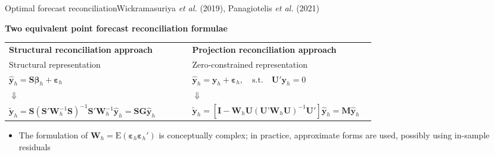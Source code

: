 \documentclass[aspectratio=169, table,colorlinks]{beamer}
\newcommand{\yvet}{\bm{y}}
\newcommand{\Gvet}{\bm{G}}
\newcommand{\Ivet}{\bm{I}}
\newcommand{\Mvet}{\bm{M}}
\newcommand{\Svet}{\bm{S}}
\newcommand{\Uvet}{\bm{U}}
\newcommand{\Wvet}{\bm{W}}
\newcommand{\betavet}{\bm{\beta}}
\newcommand{\epsvet}{\bm{\varepsilon}}
\begin{document}
\begin{frame}{Optimal forecast reconciliation}{Wickramasuriya \textit{et al.} (2019), Panagiotelis \textit{et al.} (2021)}
	\begin{block}{}\centering
\vskip0.15cm
	\textbf{Two equivalent point forecast reconciliation formulae}
\vskip0.25cm
\begin{tabular}{M{0.48\linewidth}|M{0.48\linewidth}}
	\textbf{\color{newblue}Structural reconciliation approach} & \textbf{\color{newblue}Projection reconciliation approach} \\
	{\small Structural representation} & {\small Zero-constrained representation} \\[0.25cm]
	$\widehat{\yvet}_h = \Svet \betavet_h + \epsvet_h$ & $\widehat{\yvet}_h = \yvet_h + \epsvet_h,\quad \text{s.t.} \quad \Uvet'\yvet_h = 0$\\[0.2cm]
	$\Downarrow$ & $\Downarrow$ \\[0.2cm]
	$
\widetilde{\yvet}_h = {\Svet}\left({\Svet}'\Wvet^{-1}_h
{\Svet}\right)^{-1}{\Svet}'\Wvet^{-1}_h\widehat{\yvet}_h = \Svet\Gvet\widehat{\yvet}_h
$ & $\widetilde{\yvet}_h =\left[\Ivet - \Wvet_h{\Uvet}\left({\Uvet}’\Wvet_h{\Uvet}\right)^{-1}{\Uvet}'\right]\widehat{\yvet}_h = \Mvet\widehat{\yvet}_h$\\[0.25cm]
\end{tabular}
\end{block}
\vskip0.5cm
	\begin{itemize}
	\item The formulation of $\Wvet_h = \text{E}(\epsvet_h \epsvet_h')$ is conceptually {\color{newred}complex}; in practice, approximate forms are used, possibly using in-sample residuals
\end{itemize}
\end{frame}
\end{document}
